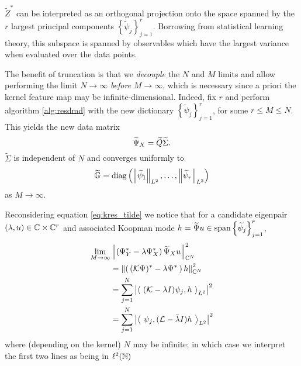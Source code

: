 $\widetilde{ Z }^*$ can be interpreted as an orthogonal projection onto the space spanned 
by the $r$ largest principal components $\left\{ \widetilde{ \psi }_j \right\}_{j=1}^r$. 
Borrowing from statistical learning theory, this subspace is spanned by observables which 
have the largest variance when evaluated over the data points. 

The benefit of truncation is that we \emph{decouple} the $N$ and $M$ limits and allow 
performing the limit $N \to \infty$ \emph{before} $M \to \infty$, which is necessary since 
a priori the kernel feature map may be infinite-dimensional. Indeed, fix $r$ and
perform algorithm \ref{alg:resdmd} with the new dictionary 
$\left\{ \widetilde{ \psi }_j \right\}_{j=1}^r$, for some $r \leq M \leq N$. This 
yields the new data matrix 
\begin{equation}
    \widetilde{\Psi}_X = \widetilde{ Q } \widetilde{ \Sigma } . 
\end{equation}
$\widetilde{ \Sigma }$ is independent of $N$ and converges uniformly to 
\begin{equation}
    \label{eq:G_tilde}
    \widetilde{ \mathbb{G} } = \text{diag} \left( 
        \left\| \widetilde{ \psi }_1 \right\|_{L^2},
        \ldots, \left\| \widetilde{ \psi }_r \right\|_{L^2} 
    \right)
\end{equation}
as $M \to \infty$. 

Reconsidering equation \ref{eq:kres_tilde} we notice that for a candidate eigenpair 
$(\lambda, u) \in \mathbb{C} \times \mathbb{C}^r$ and associated Koopman mode 
$h = \widetilde{\Psi} u \in \text{span} \left\{ \widetilde{ \psi }_j \right\}_{j=1}^r$, 
\begin{equation}
    \begin{split}
        \lim_{M \to \infty} &\left\| \left( \Psi_Y^* - \lambda \Psi_X^* \right) \widetilde{\Psi}_X u \right\|_{\mathbb{C}^N}^2 \\
        &= \left\| \left(\, (\mathcal{K} \Psi)^* - \lambda \Psi^* \,\right) h \right\|_{\mathbb{C}^N}^2 \\
        &= \sum_{j=1}^{N} \left| \left\langle\ (\mathcal{K} - \lambda I) \psi_j, h \ \right\rangle_{L^2} \right|^2 \\
        &= \sum_{j=1}^{N} \left| \left\langle\ \psi_j, (\mathcal{L} - \bar{\lambda} I) h \ \right\rangle_{L^2} \right|^2 
    \end{split}
\end{equation}
where (depending on the kernel) $N$ may be infinite; in which case we interpret 
the first two lines as being in $\ell^2 (\mathbb{N})$

